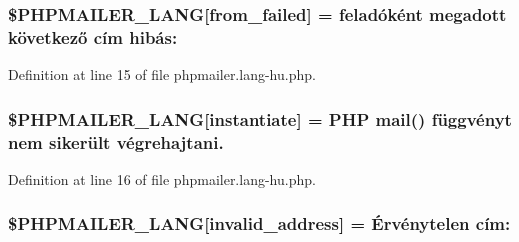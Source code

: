 \subsubsection[{\texorpdfstring{\$\+P\+H\+P\+M\+A\+I\+L\+E\+R\+\_\+\+L\+A\+NG}{$PHPMAILER_LANG}}]{\setlength{\rightskip}{0pt plus 5cm}\$P\+H\+P\+M\+A\+I\+L\+E\+R\+\_\+\+L\+A\+NG\mbox{[}\textquotesingle{}from\+\_\+failed\textquotesingle{}\mbox{]} =  feladóként megadott következő cím hibás\+: \textquotesingle{}}\hypertarget{phpmailer_8lang-hu_8php_adf832ae12155a09be077c6d5e4fd7e22}{}\label{phpmailer_8lang-hu_8php_adf832ae12155a09be077c6d5e4fd7e22}


Definition at line 15 of file phpmailer.\+lang-\/hu.\+php.

\subsubsection[{\texorpdfstring{\$\+P\+H\+P\+M\+A\+I\+L\+E\+R\+\_\+\+L\+A\+NG}{$PHPMAILER_LANG}}]{\setlength{\rightskip}{0pt plus 5cm}\$P\+H\+P\+M\+A\+I\+L\+E\+R\+\_\+\+L\+A\+NG\mbox{[}\textquotesingle{}instantiate\textquotesingle{}\mbox{]} =  P\+HP mail() függvényt nem sikerült végrehajtani.\textquotesingle{}}\hypertarget{phpmailer_8lang-hu_8php_ad58dde16780f4770ccf4dd282ea1f5ad}{}\label{phpmailer_8lang-hu_8php_ad58dde16780f4770ccf4dd282ea1f5ad}


Definition at line 16 of file phpmailer.\+lang-\/hu.\+php.

\subsubsection[{\texorpdfstring{\$\+P\+H\+P\+M\+A\+I\+L\+E\+R\+\_\+\+L\+A\+NG}{$PHPMAILER_LANG}}]{\setlength{\rightskip}{0pt plus 5cm}\$P\+H\+P\+M\+A\+I\+L\+E\+R\+\_\+\+L\+A\+NG\mbox{[}\textquotesingle{}invalid\+\_\+address\textquotesingle{}\mbox{]} = \textquotesingle{}Érvénytelen cím\+: \textquotesingle{}}\hypertarget{phpmailer_8lang-hu_8php_a42d61bcea4c79599ecb44fd062f54d47}{}\label{phpmailer_8lang-hu_8php_a42d61bcea4c79599ecb44fd062f54d47}


